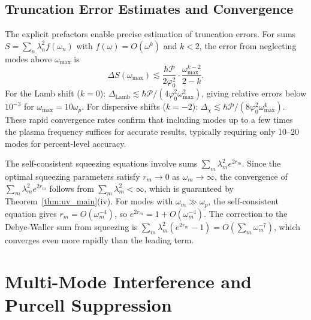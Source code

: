 \documentclass[reprint, floatfix, superscriptaddress, amsmath, amssymb, longbibliography]{revtex4-2}
\begin{document}
\subsection{Truncation Error Estimates and Convergence}
\label{sec:truncation_error}

The explicit prefactors enable precise estimation of truncation errors. For sums $S = \sum_n \lambda_n^2 f(\omega_n)$ with $f(\omega) = O(\omega^k)$ and $k < 2$, the error from neglecting modes above $\omega_{\mathrm{max}}$ is
\begin{equation}
\Delta S(\omega_{\mathrm{max}}) \lesssim \frac{\hbar \mathcal{P}}{2\varphi_0^2} \cdot \frac{\omega_{\mathrm{max}}^{k-2}}{2-k}.
\label{eq:truncation_general}
\end{equation}
For the Lamb shift ($k = 0$): $\Delta_{\mathrm{Lamb}} \lesssim \hbar\mathcal{P}/(4\varphi_0^2\omega_{\mathrm{max}}^2)$, giving relative errors below $10^{-3}$ for $\omega_{\mathrm{max}} = 10\omega_p$. For dispersive shifts ($k = -2$): $\Delta_\chi \lesssim \hbar\mathcal{P}/(8\varphi_0^2\omega_{\mathrm{max}}^4)$. These rapid convergence rates confirm that including modes up to a few times the plasma frequency suffices for accurate results, typically requiring only 10--20 modes for percent-level accuracy.


The self-consistent squeezing equations involve sums $\sum_m \lambda_m^2 e^{2r_m}$. Since the optimal squeezing parameters satisfy $r_m \to 0$ as $\omega_m \to \infty$, the convergence of $\sum_m \lambda_m^2 e^{2r_m}$ follows from $\sum_m \lambda_m^2 < \infty$, which is guaranteed by Theorem~\ref{thm:uv_main}(iv). For modes with $\omega_m \gg \omega_p$, the self-consistent equation gives $r_m = O(\omega_m^{-4})$, so $e^{2r_m} = 1 + O(\omega_m^{-4})$. The correction to the Debye-Waller sum from squeezing is $\sum_m \lambda_m^2(e^{2r_m} - 1) = O(\sum_m \omega_m^{-7})$, which converges even more rapidly than the leading term.




\section{Multi-Mode Interference and Purcell Suppression}
\label{sec:multimode_purcell}
\end{document}

